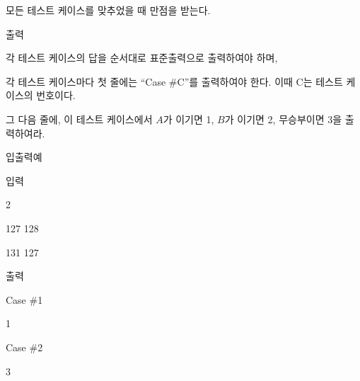 \documentclass [12pt] {oblivoir}
\begin{document}
모든 테스트 케이스를 맞추었을 때 만점을 받는다.

\vspace{5mm}

출력

각 테스트 케이스의 답을 순서대로 표준출력으로 출력하여야 하며,

각 테스트 케이스마다 첫 줄에는 “Case \#C”를 출력하여야 한다. 이때 C는 테스트 케이스의 번호이다.

그 다음 줄에, 이 테스트 케이스에서 $A$가 이기면 1, $B$가 이기면 2, 무승부이면 3을 출력하여라.

\vspace{5mm}

입출력예

\vspace{3mm}

입력

2

127 128

131 127

\vspace{3mm}

출력

Case \#1

1

Case \#2

3
\end{document}
